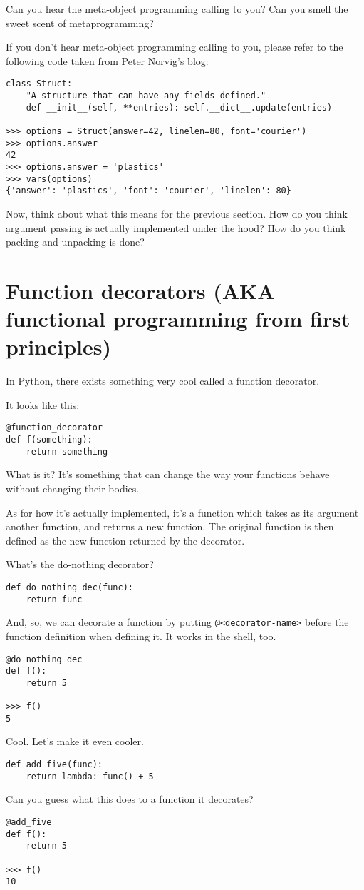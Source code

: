 \documentclass[11pt]{article}
\begin{document}
Can you hear the meta-object programming calling to you? Can you
smell the sweet scent of metaprogramming?

If you don't hear meta-object programming calling to you, please
refer to the following code taken from Peter Norvig's blog:
\begin{verbatim}
class Struct:
    "A structure that can have any fields defined."
    def __init__(self, **entries): self.__dict__.update(entries)

>>> options = Struct(answer=42, linelen=80, font='courier')
>>> options.answer
42
>>> options.answer = 'plastics'
>>> vars(options)
{'answer': 'plastics', 'font': 'courier', 'linelen': 80}
\end{verbatim}

Now, think about what this means for the previous section. How do
you think argument passing is actually implemented under the hood?
How do you think packing and unpacking is done?

\section{Function decorators (AKA functional programming from first principles)}
\label{sec:org07dfb20}
In Python, there exists something very cool called a function
decorator.

It looks like this:
\begin{verbatim}
@function_decorator
def f(something):
    return something
\end{verbatim}

What is it? It's something that can change the way your functions
behave without changing their bodies.

As for how it's actually implemented, it's a function which takes as
its argument another function, and returns a new function. The
original function is then defined as the new function returned by
the decorator.

What's the do-nothing decorator?
\begin{verbatim}
def do_nothing_dec(func):
    return func
\end{verbatim}
And, so, we can decorate a function by putting \texttt{@<decorator-name>}
before the function definition when defining it. It works in the
shell, too.
\begin{verbatim}
@do_nothing_dec
def f():
    return 5

>>> f()
5
\end{verbatim}

Cool. Let's make it even cooler. 
\begin{verbatim}
def add_five(func):
    return lambda: func() + 5
\end{verbatim}
Can you guess what this does to a function it decorates?
\begin{verbatim}
@add_five
def f():
    return 5

>>> f()
10
\end{verbatim}
\end{document}
